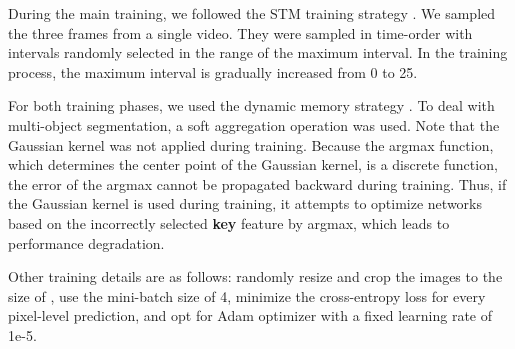 \documentclass[runningheads]{llncs}
\begin{document}
During the main training, we followed the STM training strategy \cite{Oh_2019_ICCV}. We sampled the three frames from a single video. They were sampled in time-order with intervals randomly selected in the range of the maximum interval. In the training process, the maximum interval is gradually increased from 0 to 25.

For both training phases, we used the dynamic memory strategy \cite{Oh_2019_ICCV}. To deal with multi-object segmentation, a soft aggregation operation \cite{Oh_2019_ICCV} was used. Note that the Gaussian kernel was not applied during training. Because the argmax function, which determines the center point of the Gaussian kernel, is a discrete function, the error of the argmax cannot be propagated backward during training. Thus, if the Gaussian kernel is used during training, it attempts to optimize networks based on the incorrectly selected \textbf{key} feature by argmax, which leads to performance degradation.

Other training details are as follows: randomly resize and crop the images to the size of , use the mini-batch size of 4, minimize the cross-entropy loss for every pixel-level prediction, and opt for Adam optimizer \cite{KingmaB14} with a fixed learning rate of 1e-5.
\end{document}
